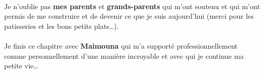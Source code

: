 \paragraph{} %
Je n’oublie pas \textbf{mes parents} et \textbf{grands-parents} qui m’ont soutenu
et qui m’ont permis de me construire et de devenir ce que je suis aujourd’hui
(merci pour les patisseries et les bons petits plats\dots).

\paragraph{} %
Je finis ce chapitre avec \textbf{Maimouna} qui m’a supporté professionnellement
comme personnellement d’une manière incroyable et avec qui je continue ma petite vie\dots

